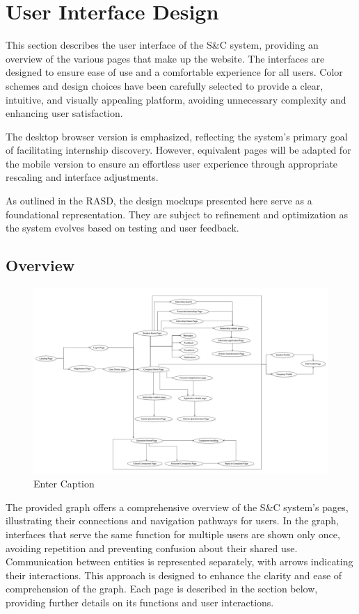 \chapter{User Interface Design}

This section describes the user interface of the S\&C system, providing an overview of the various pages that make up the website. The interfaces are designed to ensure ease of use and a comfortable experience for all users. Color schemes and design choices have been carefully selected to provide a clear, intuitive, and visually appealing platform, avoiding unnecessary complexity and enhancing user satisfaction.

The desktop browser version is emphasized, reflecting the system’s primary goal of facilitating internship discovery. However, equivalent pages will be adapted for the mobile version to ensure an effortless user experience through appropriate rescaling and interface adjustments.

As outlined in the RASD, the design mockups presented here serve as a foundational representation. They are subject to refinement and optimization as the system evolves based on testing and user feedback.

\section{Overview}

\begin{figure}[H]
    \centering
    \includegraphics[width=1\linewidth]{DD/Images/Interface Images/usecasediagram.png}
    \caption{Enter Caption}
    \label{fig:enter-label}
\end{figure}

The provided graph offers a comprehensive overview of the S\&C system’s pages, illustrating their connections and navigation pathways for users. In the graph, interfaces that serve the same function for multiple users are shown only once, avoiding repetition and preventing confusion about their shared use. Communication between entities is represented separately, with arrows indicating their interactions. This approach is designed to enhance the clarity and ease of comprehension of the graph. Each page is described in the section below, providing further details on its functions and user interactions.





